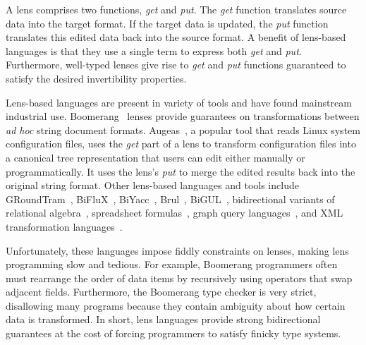 \documentclass[acmsmall]{acmart}
\begin{document}
A lens comprises two functions,
\emph{get} and \emph{put}.  The \emph{get} function translates
source data into the target format.  If the target data is updated, the
\emph{put} function translates this edited data back into the
source format.  
A benefit of lens-based languages is that they use a single term
to express both 
\emph{get} and \emph{put}.
Furthermore, well-typed lenses give rise to 
\emph{get} and \emph{put} functions 
guaranteed to satisfy the desired invertibility properties.

Lens-based languages are present in variety of tools and have found mainstream
industrial use.
Boomerang~\cite{boomerang, Matching10} lenses provide
guarantees on transformations between {\em ad hoc} string document formats.
Augeas~\cite{augeas}, a popular tool that reads Linux system configuration
files, uses the \emph{get} part of a lens to transform configuration
files into a canonical tree representation that users can edit
either manually or 
programmatically.  It uses the lens's \emph{put} to merge the edited
results back into the original string format.  Other lens-based languages and
tools include 
%
GRoundTram~\cite{Hidaka2011GRoundTramAI},
%
BiFluX~\cite{DBLP:conf/ppdp/PachecoZH14}, 
%
BiYacc~\cite{DBLP:conf/staf/ZhuK0SH15},
%
Brul~\cite{DBLP:conf/etaps/ZanLKH16},
%
BiGUL~\cite{DBLP:conf/pepm/KoZH16}, 
%
bidirectional variants of 
relational algebra~\cite{BohannonPierceVaughan},
spreadsheet formulas~\cite{DBLP:conf/vl/MacedoPSC14},
graph query languages~\cite{DBLP:conf/icfp/HidakaHIKMN10},
and
XML transformation languages~\cite{DBLP:conf/pepm/LiuHT07}.
%


%
Unfortunately, these languages impose fiddly constraints on lenses,
making lens programming slow and tedious.
For example, Boomerang
programmers often must rearrange the order of data items by recursively
using operators that swap adjacent fields.
Furthermore, the Boomerang type checker is very strict, disallowing many programs
because they contain ambiguity about how certain data is transformed.
In short, lens languages provide strong bidirectional guarantees at the cost of
forcing programmers to satisfy finicky type systems.
\end{document}
